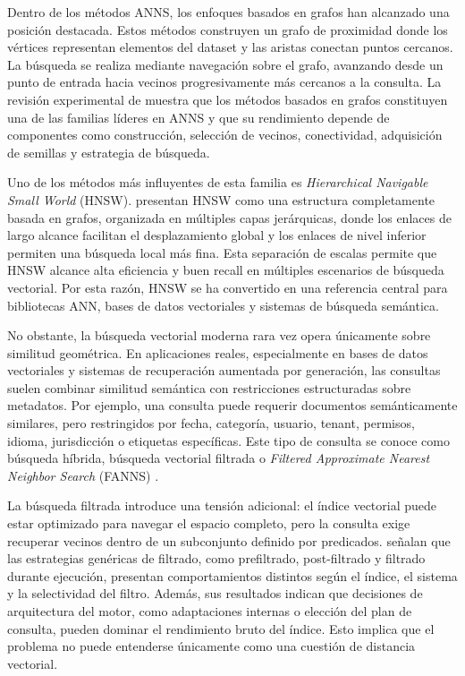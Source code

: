 Dentro de los métodos ANNS, los enfoques basados en grafos han alcanzado una posición destacada. Estos métodos construyen un grafo de proximidad donde los vértices representan elementos del dataset y las aristas conectan puntos cercanos. La búsqueda se realiza mediante navegación sobre el grafo, avanzando desde un punto de entrada hacia vecinos progresivamente más cercanos a la consulta. La revisión experimental de \textcite{wang2021comprehensive} muestra que los métodos basados en grafos constituyen una de las familias líderes en ANNS y que su rendimiento depende de componentes como construcción, selección de vecinos, conectividad, adquisición de semillas y estrategia de búsqueda.

Uno de los métodos más influyentes de esta familia es \textit{Hierarchical Navigable Small World} (HNSW). \textcite{malkov2020efficient} presentan HNSW como una estructura completamente basada en grafos, organizada en múltiples capas jerárquicas, donde los enlaces de largo alcance facilitan el desplazamiento global y los enlaces de nivel inferior permiten una búsqueda local más fina. Esta separación de escalas permite que HNSW alcance alta eficiencia y buen recall en múltiples escenarios de búsqueda vectorial. Por esta razón, HNSW se ha convertido en una referencia central para bibliotecas ANN, bases de datos vectoriales y sistemas de búsqueda semántica.

No obstante, la búsqueda vectorial moderna rara vez opera únicamente sobre similitud geométrica. En aplicaciones reales, especialmente en bases de datos vectoriales y sistemas de recuperación aumentada por generación, las consultas suelen combinar similitud semántica con restricciones estructuradas sobre metadatos. Por ejemplo, una consulta puede requerir documentos semánticamente similares, pero restringidos por fecha, categoría, usuario, tenant, permisos, idioma, jurisdicción o etiquetas específicas. Este tipo de consulta se conoce como búsqueda híbrida, búsqueda vectorial filtrada o \textit{Filtered Approximate Nearest Neighbor Search} (FANNS) \parencite{amanbayev2026filtered,patel2024acorn,gollapudi2023filtered}.

La búsqueda filtrada introduce una tensión adicional: el índice vectorial puede estar optimizado para navegar el espacio completo, pero la consulta exige recuperar vecinos dentro de un subconjunto definido por predicados. \textcite{amanbayev2026filtered} señalan que las estrategias genéricas de filtrado, como prefiltrado, post-filtrado y filtrado durante ejecución, presentan comportamientos distintos según el índice, el sistema y la selectividad del filtro. Además, sus resultados indican que decisiones de arquitectura del motor, como adaptaciones internas o elección del plan de consulta, pueden dominar el rendimiento bruto del índice. Esto implica que el problema no puede entenderse únicamente como una cuestión de distancia vectorial.

